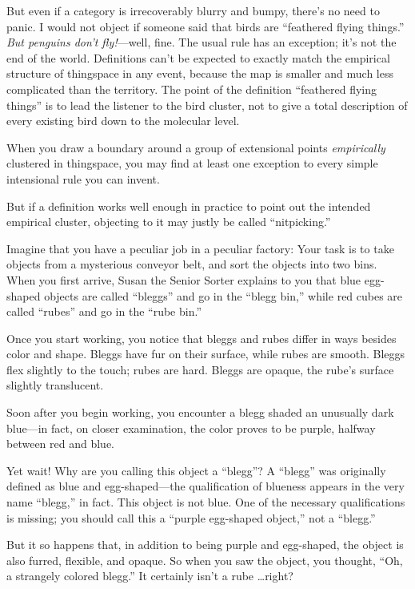 {
 But even if a category is irrecoverably blurry and bumpy,
there's no need to panic. I would not object if someone
said that birds are ``feathered flying
things.'' \textit{But penguins don't
fly!}{}---well, fine. The usual rule has an exception;
it's not the end of the world. Definitions
can't be expected to exactly match the empirical
structure of thingspace in any event, because the map is smaller and
much less complicated than the territory. The point of the definition
``feathered flying things'' is to
lead the listener to the bird cluster, not to give a total description
of every existing bird down to the molecular level.}

{
 When you draw a boundary around a group of extensional points
\textit{empirically} clustered in thingspace, you may find at least one
exception to every simple intensional rule you can invent.}

{
 But if a definition works well enough in practice to point out the
intended empirical cluster, objecting to it may justly be called
``nitpicking.''}

\myendsectiontext


{
 Imagine that you have a peculiar job in a peculiar factory: Your
task is to take objects from a mysterious conveyor belt, and sort the
objects into two bins. When you first arrive, Susan the Senior Sorter
explains to you that blue egg-shaped objects are called
``bleggs'' and go in the
``blegg bin,'' while red cubes are
called ``rubes'' and go in the
``rube bin.'' }

{
 Once you start working, you notice that bleggs and rubes differ in
ways besides color and shape. Bleggs have fur on their surface, while
rubes are smooth. Bleggs flex slightly to the touch; rubes are hard.
Bleggs are opaque, the rube's surface slightly
translucent.}

{
 Soon after you begin working, you encounter a blegg shaded an
unusually dark blue---in fact, on closer examination, the color proves
to be purple, halfway between red and blue.}

{
 Yet wait! Why are you calling this object a
``blegg''? A
``blegg'' was originally defined as
blue and egg-shaped---the qualification of blueness appears in the very
name ``blegg,'' in fact. This object
is not blue. One of the necessary qualifications is missing; you should
call this a ``purple egg-shaped
object,'' not a
``blegg.''}

{
 But it so happens that, in addition to being purple and
egg-shaped, the object is also furred, flexible, and opaque. So when
you saw the object, you thought, ``Oh, a strangely
colored blegg.'' It certainly isn't a
rube \ldots right?}

